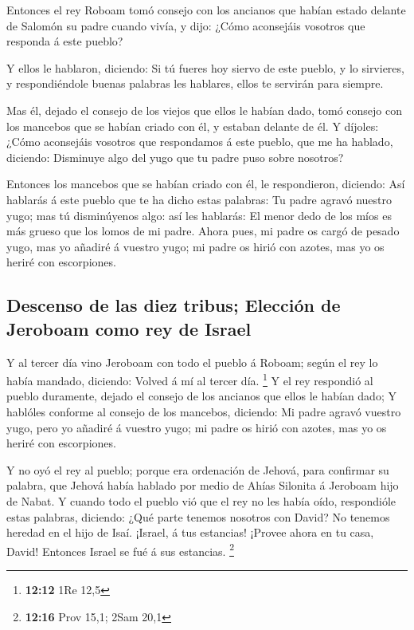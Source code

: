  Entonces el rey Roboam tomó consejo con los ancianos que
habían estado delante de Salomón su padre cuando vivía, y dijo: ¿Cómo
aconsejáis vosotros que responda á este pueblo?

 Y ellos le hablaron, diciendo: Si tú fueres hoy siervo de
este pueblo, y lo sirvieres, y respondiéndole buenas palabras les
hablares, ellos te servirán para siempre.

 Mas él, dejado el consejo de los viejos que ellos le habían
dado, tomó consejo con los mancebos que se habían criado con él, y
estaban delante de él.  Y díjoles: ¿Cómo aconsejáis vosotros
que respondamos á este pueblo, que me ha hablado, diciendo: Disminuye
algo del yugo que tu padre puso sobre nosotros?

 Entonces los mancebos que se habían criado con él, le
respondieron, diciendo: Así hablarás á este pueblo que te ha dicho estas
palabras: Tu padre agravó nuestro yugo; mas tú disminúyenos algo: así
les hablarás: El menor dedo de los míos es más grueso que los lomos de
mi padre.  Ahora pues, mi padre os cargó de pesado yugo,
mas yo añadiré á vuestro yugo; mi padre os hirió con azotes, mas yo os
heriré con escorpiones.

\hypertarget{descenso-de-las-diez-tribus-elecciuxf3n-de-jeroboam-como-rey-de-israel}{%
\subsection{Descenso de las diez tribus; Elección de Jeroboam como rey
de
Israel}\label{descenso-de-las-diez-tribus-elecciuxf3n-de-jeroboam-como-rey-de-israel}}

 Y al tercer día vino Jeroboam con todo el pueblo á Roboam;
según el rey lo había mandado, diciendo: Volved á mí al tercer día.
\footnote{\textbf{12:12} 1Re 12,5}  Y el rey respondió al
pueblo duramente, dejado el consejo de los ancianos que ellos le habían
dado;  Y hablóles conforme al consejo de los mancebos,
diciendo: Mi padre agravó vuestro yugo, pero yo añadiré á vuestro yugo;
mi padre os hirió con azotes, mas yo os heriré con escorpiones.

 Y no oyó el rey al pueblo; porque era ordenación de
Jehová, para confirmar su palabra, que Jehová había hablado por medio de
Ahías Silonita á Jeroboam hijo de Nabat.  Y cuando todo el
pueblo vió que el rey no les había oído, respondióle estas palabras,
diciendo: ¿Qué parte tenemos nosotros con David? No tenemos heredad en
el hijo de Isaí. ¡Israel, á tus estancias! ¡Provee ahora en tu casa,
David! Entonces Israel se fué á sus estancias. \footnote{\textbf{12:16}
  Prov 15,1; 2Sam 20,1}

